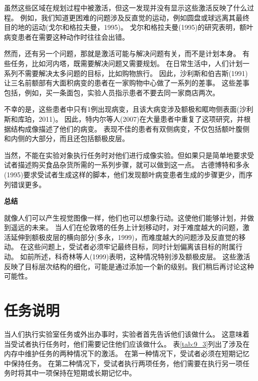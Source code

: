 虽然这些区域在规划过程中被激活，但这一发现并没有显示这些激活反映了什么过程。
例如，我们知道更困难的问题涉及反直觉的运动，例如圆盘或球远离其最终目的地的运动(戈尔和格拉夫曼，1995)。
戈尔和格拉夫曼(1995)的研究表明，额叶病变患者在需要这种动作时往往会出错。
\par


然而，还有另一个问题，那就是激活可能与解决问题有关，而不是计划本身。
有些任务，比如河内塔，既需要解决问题又需要规划。
在日常生活中，人们计划一系列不需要解决太多问题的目标，比如购物旅行。
因此，沙利斯和伯吉斯(1991)让三名前额部有大面积病变的患者在一家购物中心做了一系列的差事。
这些差事包括，例如，买一条面包，实验人员指示患者不要去同一家商店两次。
\par


不幸的是，这些患者中只有1例出现病变，且该大病变涉及额极和眶吻侧表面(沙利斯和库珀，2011)。
因此，特内尔等人(2007)在大量患者中重复了这项研究，并根据结构成像描述了他们的病变。
表现不佳的患者有双侧病变，不仅包括额叶腹侧和内侧的大部分，而且还包括额极皮层。
\par


当然，不能在实验对象执行任务时对他们进行成像实验。但如果只是简单地要求受试者描述购买食品杂货所需的一系列步骤，就可以做到这一点。
古德博特和多永(1995)要求受试者生成这样的脚本，他们发现额叶病变患者生成的步骤更少，而序列错误更多。
\par


\textbf{总结}

就像人们可以产生视觉图像一样，他们也可以想象行动。这使他们能够计划，并做到遥远的未来。
当人们在伦敦塔的任务上计划移动时，对于难度越大的问题，激活延伸到额极皮层的横向部分(多永，1999)，而难度越大的问题涉及反直觉的移动。
在这些问题上，受试者必须牢记最终目标，同时计划偏离该目标的附属行动。
如前所述，科奇林等人(1999)表明，这种情况特别涉及额极皮层。
这些激活反映了目标层次结构的细化，可能是通过添加一个新的级别。我们稍后再讨论这种可能性。



\section{任务说明}
\par

当人们执行实验室任务或外出办事时，实验者首先告诉他们该做什么。
这意味着当受试者执行任务时，他们需要记住他们应该做什么。
表\ref{tab:9_3}列出了涉及在内存中维护任务的两种情况下的激活。
在第一种情况下，受试者必须在短期记忆中保持任务。
在第二种情况下，受试者执行两项任务，他们需要在执行另一项任务时将其中一项保持在短期或长期记忆中。



